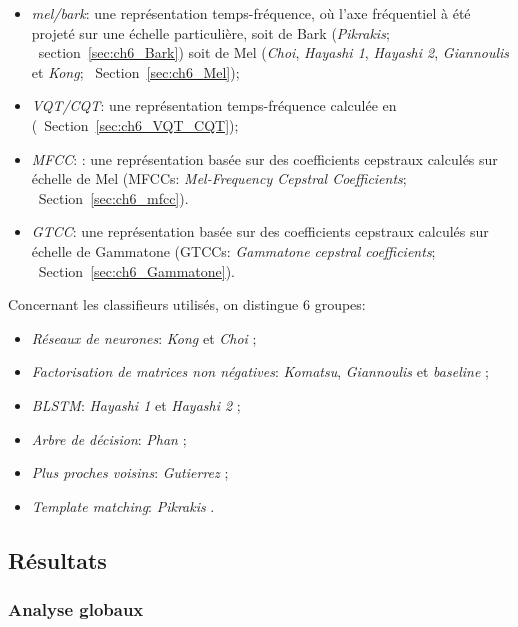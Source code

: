 \begin{itemize}
\item \emph{mel/bark}: une représentation temps-fréquence, où l'axe fréquentiel à été projeté sur une échelle particulière, soit de Bark (\emph{Pikrakis}; \cf~section~\ref{sec:ch6_Bark}) soit de Mel (\emph{Choi}, \emph{Hayashi 1}, \emph{Hayashi 2}, \emph{Giannoulis} et \emph{Kong}; \cf~Section~\ref{sec:ch6_Mel});
\item \emph{VQT/CQT}: une représentation temps-fréquence calculée en (\cf~Section~\ref{sec:ch6_VQT_CQT});
\item \emph{MFCC}: : une représentation basée sur des coefficients cepstraux calculés sur échelle de Mel (MFCCs: \emph{Mel-Frequency Cepstral Coefficients}; \cf~Section~\ref{sec:ch6_mfcc}).
\item \emph{GTCC}: une représentation basée sur des coefficients cepstraux calculés sur échelle de Gammatone (GTCCs: \emph{Gammatone cepstral coefficients}; \cf~Section~\ref{sec:ch6_Gammatone}).
\end{itemize}

Concernant les classifieurs utilisés, on distingue 6 groupes:

\begin{itemize}
\item \emph{Réseaux de neurones}: \emph{Kong} et \emph{Choi}  ;
\item \emph{Factorisation de matrices non négatives}: \emph{Komatsu}, \emph{Giannoulis} et \emph{baseline}   ;
\item \emph{BLSTM}: \emph{Hayashi 1} et \emph{Hayashi 2} ;
\item \emph{Arbre de décision}: \emph{Phan} ;
\item \emph{Plus proches voisins}: \emph{Gutierrez} ;
\item \emph{Template matching}: \emph{Pikrakis} .
\end{itemize}

\subsection{Résultats}

\subsubsection{Analyse globaux}
\label{sec:ch7_analyseGlobaleDcase2016}

